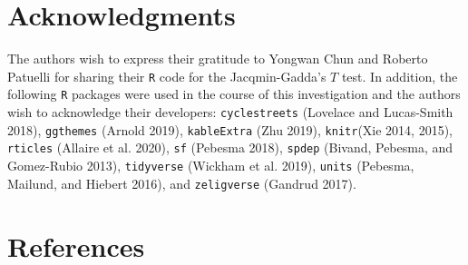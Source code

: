 \documentclass[smallextended]{svjour3}       %
\begin{document}
\hypertarget{sec:acknowledgments}{%
\section{Acknowledgments}\label{sec:acknowledgments}}

The authors wish to express their gratitude to Yongwan Chun and Roberto
Patuelli for sharing their \texttt{R} code for the Jacqmin-Gadda's \(T\)
test. In addition, the following \texttt{R} packages were used in the
course of this investigation and the authors wish to acknowledge their
developers: \texttt{cyclestreets} (Lovelace and Lucas-Smith 2018),
\texttt{ggthemes} (Arnold 2019), \texttt{kableExtra} (Zhu 2019),
\texttt{knitr}(Xie 2014, 2015), \texttt{rticles} (Allaire et al. 2020),
\texttt{sf} (Pebesma 2018), \texttt{spdep} (Bivand, Pebesma, and
Gomez-Rubio 2013), \texttt{tidyverse} (Wickham et al. 2019),
\texttt{units} (Pebesma, Mailund, and Hiebert 2016), and
\texttt{zeligverse} (Gandrud 2017).

\hypertarget{references}{%
\section*{References}\label{references}}
\end{document}
